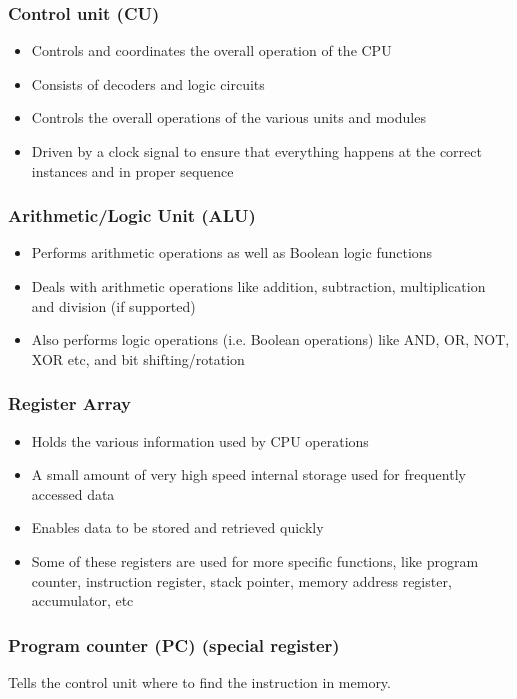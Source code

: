 \documentclass[11pt]{article}
\begin{document}
\subsubsection{Control unit (CU)}
\label{sec:orgc5ca67e}
\begin{itemize}
\item Controls and coordinates the overall operation of the CPU
\item Consists of decoders and logic circuits
\item Controls the overall operations of the various units and modules
\item Driven by a clock signal to ensure that everything happens at the correct instances and in proper sequence
\end{itemize}

\subsubsection{Arithmetic/Logic Unit (ALU)}
\label{sec:orgdc45468}
\begin{itemize}
\item Performs arithmetic operations as well as Boolean logic functions
\item Deals with arithmetic operations like addition, subtraction, multiplication and division (if supported)
\item Also performs logic operations (i.e. Boolean operations) like AND, OR, NOT, XOR etc, and bit shifting/rotation
\end{itemize}

\subsubsection{Register Array}
\label{sec:orgfe3a1ef}
\begin{itemize}
\item Holds the various information used by CPU operations
\item A small amount of very high speed internal storage used for frequently accessed data
\item Enables data to be stored and retrieved quickly
\item Some of these registers are used for more specific functions, like program counter, instruction register, stack pointer, memory address register, accumulator, etc
\end{itemize}

\subsubsection{Program counter (PC) (special register)}
\label{sec:orga3e62ed}
Tells the control unit where to find the instruction in memory.
\end{document}
